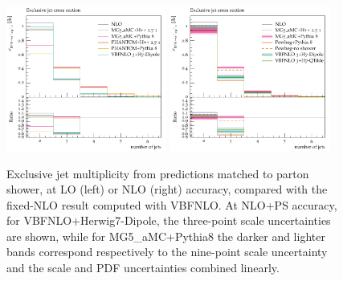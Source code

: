 \begin{figure}[hbt]
\centering
\includegraphics[width=0.47\textwidth]{figures/LOPS/jetsexclusive.pdf}
\includegraphics[width=0.47\textwidth]{figures/NLOPS/jetsexclusive.pdf}
\caption{Exclusive jet multiplicity from predictions matched to parton shower, at LO (left) or NLO (right) accuracy, compared with the fixed-NLO result computed with {\sc VBFNLO}. At NLO+PS accuracy, for
    {\sc VBFNLO}+{\sc Herwig7-Dipole}, the three-point scale uncertainties are shown, while for {\sc MG5\_aMC}+{\sc Pythia8} the darker and lighter bands correspond  
    respectively to the nine-point scale uncertainty and the scale and PDF uncertainties combined linearly. }
\label{fig:PSnjet}
\end{figure}
 
